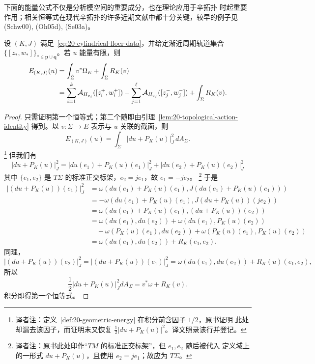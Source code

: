 下面的能量公式不仅是分析\personFloer{}模空间的重要成分，也在\personFloer{}理论应用于辛拓扑
时起重要作用；相关恒等式在现代辛拓扑的许多近期文献中都十分关键，较早的例子见
(Schw00), (Oh05d), (Se03a)。

\begin{proposition}
\label{prop:20-energy-curvature-identity}
设 $(K,J)$ 满足~\eqref{eq:20-cylindrical-floer-data}，并给定渐近周期轨道集合
$\{[z_*,w_*]\}_{*\in\mathbf p\cup\mathbf q}$。若 $u$ 能量有限，则
\begin{align}
 E_{(K,J)}(u)
 &=\int_{\dot\Sigma}v^*\Omega_E+\int_\Sigma R_K(v)\notag\\
 &=\sum_{i=1}^k\mathcal A_{H_{p_i}}([z_i^+,w_i^+])
 -\sum_{j=1}^\ell\mathcal A_{H_{q_j}}([z_j^-,w_j^-])
 +\int_\Sigma R_K(v).
 \label{eq:20-energy-curvature}
\end{align}
\end{proposition}

\begin{proof}
只需证明第一个恒等式；第二个随即由引理~\ref{lem:20-topological-action-identity}
得到。以 $v:\Sigma\to E$ 表示与 $u$ 关联的截面，则
\[
 E_{(K,J)}(u)=\int_{\dot\Sigma}|du+P_K(u)|_J^2\,dA_\Sigma.
\]
\footnote{译者注：定义~\ref{def:20-geometric-energy} 在积分前含因子 $1/2$，原书证明
此处却漏去该因子，而证明末又恢复 $\frac12|du+P_K(u)|^2$。译文照录该行并登记。}
但我们有
\[
 |du+P_K(u)|_J^2
 =|du(e_1)+P_K(u)(e_1)|_J^2
 +|du(e_2)+P_K(u)(e_2)|_J^2
\]
其中 $\{e_1,e_2\}$ 是 $T\Sigma$ 的标准正交标架，$e_2=je_1$，故
$e_1=-je_2$。
\footnote{译者注：原书此处印作“$TM$ 的标准正交标架”，但 $e_1,e_2$ 随后被代入
定义域上的一形式 $du+P_K(u)$，且使用 $e_2=je_1$；故应为 $T\Sigma$。}
于是
\begin{align*}
 |(du+P_K(u))(e_1)|_J^2
 &=\omega(du(e_1)+P_K(u)(e_1),J(du(e_1)+P_K(u)(e_1)))\\
 &=-\omega(du(e_1)+P_K(u)(e_1),J(du+P_K(u))(je_2))\\
 &=\omega(du(e_1)+P_K(u)(e_1),(du+P_K(u))(e_2))\\
 &=\omega(du(e_1),du(e_2))+\omega(du(e_1),P_K(u)(e_2))\\
 &\quad+\omega(P_K(u)(e_1),du(e_2))
 +\omega(P_K(u)(e_1),P_K(u)(e_2))\\
 &=\omega(du(e_1),du(e_2))+R_K(e_1,e_2).
\end{align*}
同理，
\[
 |(du+P_K(u))(e_2)|_J^2=|(du+P_K(u))(e_1)|_J^2
 =\omega(du(e_1),du(e_2))+R_K(u)(e_1,e_2),
\]
所以
\[
 \frac12|du+P_K(u)|_J^2dA_\Sigma=v^*\omega+R_K(v).
\]
积分即得第一个恒等式。
\end{proof}

